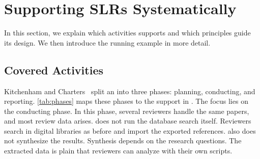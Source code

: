 \section{Supporting \acsp{SLR} Systematically}\label{sec:approach}

In this section, we explain which \SLR activities \SaiLoR supports and which principles guide its design.
We then introduce the running example in more detail.

\subsection{Covered Activities}\label{sec:approach-activities}

Kitchenham and Charters~\cite{kitchenham2007guidelines} split an \SLR into three phases: planning, conducting, and reporting.
\autoref{tab:phases} maps these phases to the support in \SaiLoR.
The focus lies on the conducting phase.
In this phase, several reviewers handle the same papers, and most review data arises.
\SaiLoR does not run the database search itself.
Reviewers search in digital libraries as before and import the exported references.
\SaiLoR also does not synthesize the results.
Synthesis depends on the research questions.
The extracted data is plain \JSON that reviewers can analyze with their own scripts.

